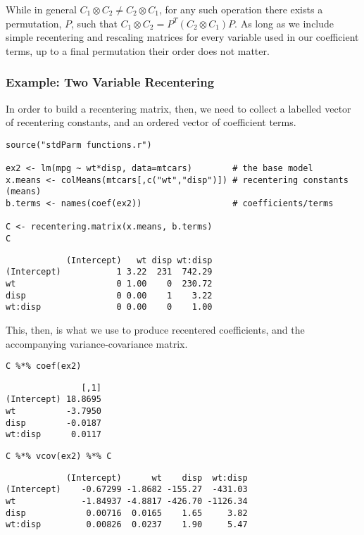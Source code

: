 \documentclass[]{article}
\begin{document}
While in general \(C_1 \otimes C_2 \neq C_2 \otimes C_1\), for any such
operation there exists a permutation, \(P\), such that
\(C_1 \otimes C_2 = P^T(C_2 \otimes C_1)P\). As long as we include
simple recentering and rescaling matrices for every variable used in our
coefficient terms, up to a final permutation their order does not
matter.

\subsubsection{Example: Two Variable
Recentering}\label{example-two-variable-recentering}

In order to build a recentering matrix, then, we need to collect a
labelled vector of recentering constants, and an ordered vector of
coefficient terms.

\begin{verbatim}
source("stdParm functions.r")

ex2 <- lm(mpg ~ wt*disp, data=mtcars)        # the base model
x.means <- colMeans(mtcars[,c("wt","disp")]) # recentering constants (means)
b.terms <- names(coef(ex2))                  # coefficients/terms

C <- recentering.matrix(x.means, b.terms)
C
\end{verbatim}

\begin{verbatim}
            (Intercept)   wt disp wt:disp
(Intercept)           1 3.22  231  742.29
wt                    0 1.00    0  230.72
disp                  0 0.00    1    3.22
wt:disp               0 0.00    0    1.00
\end{verbatim}

This, then, is what we use to produce recentered coefficients, and the
accompanying variance-covariance matrix.

\begin{verbatim}
C %*% coef(ex2)
\end{verbatim}

\begin{verbatim}
               [,1]
(Intercept) 18.8695
wt          -3.7950
disp        -0.0187
wt:disp      0.0117
\end{verbatim}

\begin{verbatim}
C %*% vcov(ex2) %*% C
\end{verbatim}

\begin{verbatim}
            (Intercept)      wt    disp  wt:disp
(Intercept)    -0.67299 -1.8682 -155.27  -431.03
wt             -1.84937 -4.8817 -426.70 -1126.34
disp            0.00716  0.0165    1.65     3.82
wt:disp         0.00826  0.0237    1.90     5.47
\end{verbatim}
\end{document}
